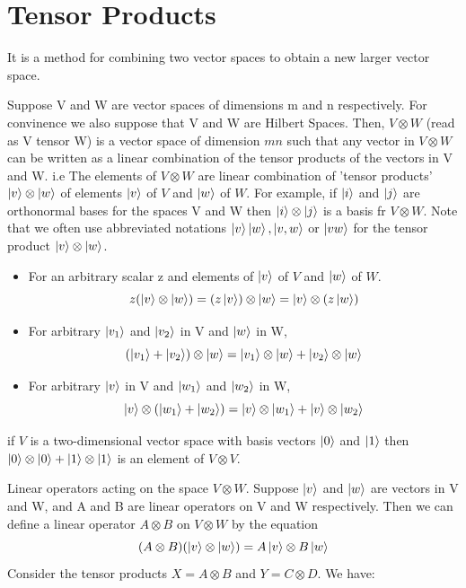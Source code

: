 \section{Tensor Products}
It is a method for combining two vector spaces to obtain a new larger vector space. 
\begin{definition}
    Suppose V and W are vector spaces of dimensions m and n respectively. For convinence we also suppose that V and W are Hilbert Spaces. Then,
    $V \otimes W$ (read as V tensor W) is a vector space of dimension $mn$ such that any vector in $V \otimes W$ can be written as a linear combination of the tensor products of the vectors in V and W. i.e 
    The elements of $V \otimes W$ are linear combination of 'tensor products' $\ket{v} \otimes \ket{w}$ of elements $\ket{v}$ of $V$ and $\ket{w}$ of $W$. For example, if $\ket{i}$ and 
    $\ket{j}$ are orthonormal bases for the spaces V and W then $\ket{i} \otimes \ket{j}$ is a basis fr $V \otimes W$. Note that we often use abbreviated notations $\ket{v}\ket{w},\ket{v,w}$ 
    or $\ket{vw}$ for the tensor product $\ket{v} \otimes \ket{w}$. 
    \begin{itemize}
        \item For an arbitrary scalar z and elements of $\ket{v}$ of $V$ and $\ket{w}$ of $W$.
        \[ z(\ket{v} \otimes \ket{w}) = (z\ket{v}) \otimes \ket{w} = \ket{v} \otimes (z\ket{w}) \]
        \item For arbitrary $\ket{v_1}$ and $\ket{v_2}$ in V and $\ket{w}$ in W,
        \[ (\ket{v_1}+\ket{v_2}) \otimes \ket{w} = \ket{v_1} \otimes \ket{w} + \ket{v_2} \otimes \ket{w} \]
        \item For arbitrary $\ket{v}$ in V and $\ket{w_1}$ and $\ket{w_2}$ in W,
        \[ \ket{v} \otimes (\ket{w_1}+\ket{w_2}) = \ket{v} \otimes \ket{w_1} + \ket{v} \otimes \ket{w_2} \]
    \end{itemize}
\end{definition}

\begin{example}
    if $V$ is a two-dimensional vector space with basis vectors $\ket{0}$ and $\ket{1}$ then $\ket{0} \otimes \ket{0} + \ket{1} \otimes \ket{1}$ is an element of 
    $V \otimes V$.
\end{example}

Linear operators acting on the space $V\otimes W$. Suppose $\ket{v}$ and $\ket{w}$ are vectors in V and W, and A and B are linear operators 
on V and W respectively. Then we can define a linear operator $A \otimes B$ on $V \otimes W$ by the equation
\[ (A \otimes B)(\ket{v} \otimes \ket{w}) = A\ket{v} \otimes B\ket{w} \]
Consider the tensor products \(X = A \otimes B\) and \(Y = C \otimes D\). We have:

